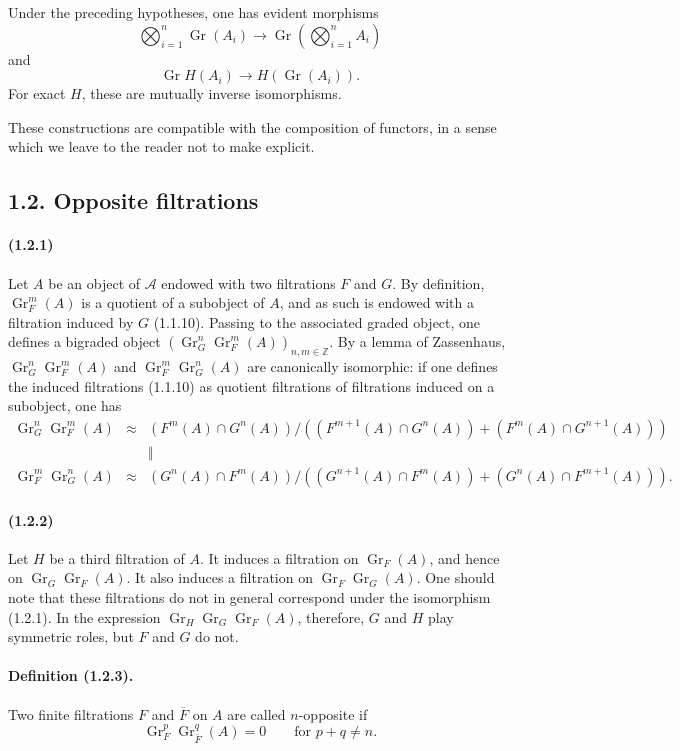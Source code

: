 \documentclass[10pt]{article}
\newcommand{\Z}{\mathbb Z}
\newcommand{\Gr}{\operatorname{Gr}}
\newcommand{\calA}{\mathcal A}
\begin{document}
Under the preceding hypotheses, one has evident morphisms
\[
\bigotimes_{i=1}^n\Gr(A_i)\to \Gr\left(\bigotimes_{i=1}^nA_i\right)
\]
and
\[
\Gr H(A_i)\to H(\Gr(A_i)).
\]
For exact $H$, these are mutually inverse isomorphisms.

These constructions are compatible with the composition of functors, in a sense which we leave to the reader not to make explicit.

\subsection*{1.2. Opposite filtrations}

\paragraph{(1.2.1)} Let $A$ be an object of $\calA$ endowed with two filtrations $F$ and $G$. By definition, $\Gr_F^m(A)$ is a quotient of a subobject of $A$, and as such is endowed with a filtration induced by $G$ (1.1.10). Passing to the associated graded object, one defines a bigraded object $(\Gr_G^n\Gr_F^m(A))_{n,m\in\Z}$. By a lemma of Zassenhaus, $\Gr_G^n\Gr_F^m(A)$ and $\Gr_F^m\Gr_G^n(A)$ are canonically isomorphic: if one defines the induced filtrations (1.1.10) as quotient filtrations of filtrations induced on a subobject, one has
\[
\begin{array}{rcc}
\Gr_G^n\Gr_F^m(A)&\approx&
(F^m(A)\cap G^n(A))/((F^{m+1}(A)\cap G^n(A))+(F^m(A)\cap G^{n+1}(A)))\\
&&\Big\Vert\\
\Gr_F^m\Gr_G^n(A)&\approx&
(G^n(A)\cap F^m(A))/((G^{n+1}(A)\cap F^m(A))+(G^n(A)\cap F^{m+1}(A))).
\end{array}
\]

\paragraph{(1.2.2)} Let $H$ be a third filtration of $A$. It induces a filtration on $\Gr_F(A)$, and hence on $\Gr_G\Gr_F(A)$. It also induces a filtration on $\Gr_F\Gr_G(A)$. One should note that these filtrations do not in general correspond under the isomorphism (1.2.1). In the expression $\Gr_H\Gr_G\Gr_F(A)$, therefore, $G$ and $H$ play symmetric roles, but $F$ and $G$ do not.

\paragraph{Definition (1.2.3).} Two finite filtrations $F$ and $\overline F$ on $A$ are called $n$-opposite if
\[
\Gr_F^p\Gr_{\overline F}^{q}(A)=0\qquad\text{for }p+q\ne n.
\]
\end{document}
